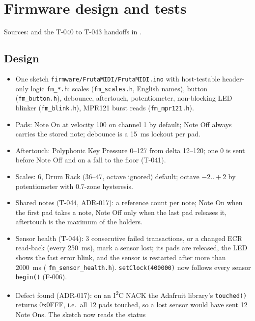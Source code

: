 \section{Firmware design and tests}
\label{sec:firmware}

Sources:  and the T-040 to T-043 handoffs in
.

\subsection{Design}
\begin{itemize}[noitemsep]
  \item One sketch \nolinkurl{firmware/FrutaMIDI/FrutaMIDI.ino} with host-testable
        header-only logic \texttt{fm\_*.h}: scales (\texttt{fm\_scales.h}, English
        names), button (\texttt{fm\_button.h}), debounce, aftertouch, potentiometer,
        non-blocking LED blinker (\texttt{fm\_blink.h}), MPR121 burst reads
        (\texttt{fm\_mpr121.h}).
  \item Pads: Note On at velocity 100 on channel 1 by default; Note Off always
        carries the stored note; debounce is a \qty{15}{\milli\second} lockout per
        pad.
  \item Aftertouch: Polyphonic Key Pressure 0--127 from delta 12--120; one 0 is
        sent before Note Off and on a fall to the floor (T-041).
  \item Scales: 6, Drum Rack (36--47, octave ignored) default; octave $-2..+2$ by
        potentiometer with 0.7-zone hysteresis.
  \item Shared notes (T-044, ADR-017): a reference count per note; Note On when the
        first pad takes a note, Note Off only when the last pad releases it,
        aftertouch is the maximum of the holders.
  \item Sensor health (T-044): 3 consecutive failed transactions, or a changed ECR
        read-back (every \qty{250}{\milli\second}), mark a sensor lost; its pads are
        released, the LED shows the fast error blink, and the sensor is restarted
        after more than \qty{2000}{\milli\second} (
        \nolinkurl{fm_sensor_health.h}). \texttt{setClock(400000)} now follows every
        sensor \texttt{begin()} (F-006).
  \item Defect found (ADR-017): on an I\textsuperscript{2}C NACK the Adafruit
        library's \texttt{touched()} returns 0x0FFF, i.e.\ all 12 pads touched, so a
        lost sensor would have sent 12 Note Ons. The sketch now reads the status

\end{itemize}
